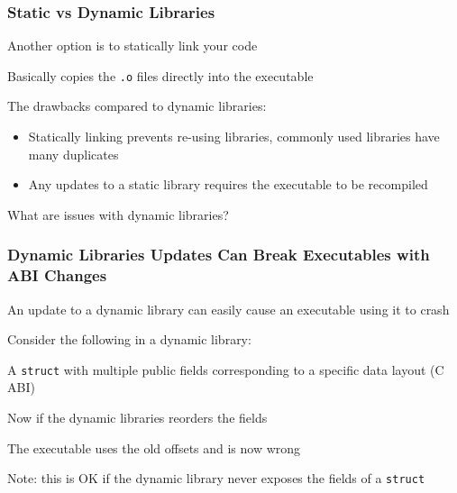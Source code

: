\documentclass[aspectratio=169]{beamer}
\begin{document}
  \begin{frame}
    \frametitle{Static vs Dynamic Libraries}

    Another option is to statically link your code

    \hspace{1em} Basically copies the \texttt{.o} files directly into the
    executable

    \vspace{2em}

    The drawbacks compared to dynamic libraries:
    \begin{itemize}
      \item Statically linking prevents re-using libraries, commonly used
            libraries have many duplicates
      \item Any updates to a static library requires the executable to be
            recompiled
    \end{itemize}

    \vspace{2em}

    What are issues with dynamic libraries?
  \end{frame}

  \begin{frame}
    \frametitle{Dynamic Libraries Updates Can Break Executables with ABI
                Changes}

    An update to a dynamic library can easily cause an executable using it to
    crash

    \vspace{1em}

    Consider the following in a dynamic library:

    \hspace{1em} A \texttt{struct} with multiple public fields corresponding to
    a specific data layout (C ABI)

    \vspace{1em}


    \vspace{1em}

    Now if the dynamic libraries reorders the fields

    \hspace{1em} The executable uses the old offsets and is now wrong

    \vspace{1em}

    Note: this is OK if the dynamic library never exposes the fields of a
    \texttt{struct}
  \end{frame}
\end{document}
